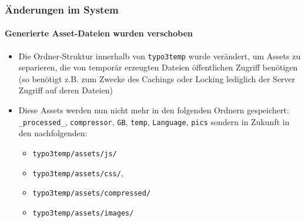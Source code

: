 \begin{frame}[fragile]
	\frametitle{Änderungen im System}
	\framesubtitle{Generierte Asset-Dateien wurden verschoben}

	\lstset{basicstyle=\tiny\ttfamily}

	\begin{itemize}

		\item Die Ordner-Struktur innerhalb von \texttt{typo3temp} wurde verändert, um Assets zu separieren, die von temporär erzeugten Dateien öffentlichen Zugriff benötigen (so benötigt z.B. zum Zwecke des Cachings oder Locking lediglich der Server Zugriff auf deren Dateien)

		\item Diese Assets werden nun nicht mehr in den folgenden Ordnern gespeichert:\newline
			\texttt{\_processed\_}, \texttt{compressor}, \texttt{GB}, \texttt{temp},
			\texttt{Language}, \texttt{pics}\newline
			sondern in Zukunft in den nachfolgenden:

			\begin{itemize}
				\item \texttt{typo3temp/assets/js/}
				\item \texttt{typo3temp/assets/css/},
				\item \texttt{typo3temp/assets/compressed/}
				\item \texttt{typo3temp/assets/images/}
			\end{itemize}

	\end{itemize}

\end{frame}

